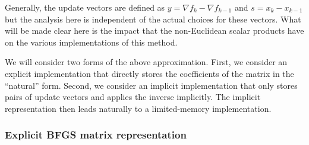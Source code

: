 Generally, the update vectors are defined as $y = {}\nabla f_k - {}\nabla
f_{k-1}$ and $s = x_k - x_{k-1}$ but the analysis here is independent of the
actual choices for these vectors.  What will be made clear here is the impact
that the non-Euclidean scalar products have on the various implementations of
this method.

We will consider two forms of the above approximation.  First, we consider an
explicit implementation that directly stores the coefficients of the matrix in
the ``natural'' form.  Second, we consider an implicit implementation that
only stores pairs of update vectors and applies the inverse implicitly.  The
implicit representation then leads naturally to a limited-memory
implementation.

\subsubsection*{Explicit BFGS matrix representation}

